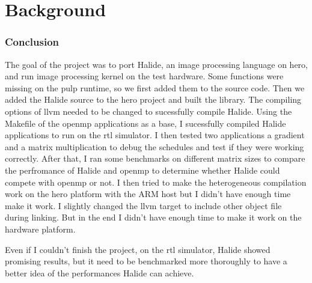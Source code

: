 
\chapter{Background}


\subsection{Conclusion}
The goal of the project was to port Halide, an image processing language on \gls{hero}, and run image processing kernel on the test hardware.
Some functions were missing on the \gls{pulp} runtime, so we first added them to the source code. 
Then we added the Halide source to the \gls{hero} project and built the library. The compiling options of \gls{llvm} needed to be changed to sucessfully compile Halide.
Using the Makefile of the \gls{openmp} applications as a base, I sucessfully compiled Halide applications to run on the \gls{rtl} simulator.
I then tested two applications a gradient and a matrix multiplication to debug the schedules and test if they were working correctly.
After that, I ran some benchmarks on different matrix sizes to compare the perfromance of Halide and \gls{openmp} to determine whether Halide could compete with \gls{openmp} or not.
I then tried to make the heterogeneous compilation work on the \gls{hero} platform with the ARM host but I didn't have enough time make it work. I slightly changed the \gls{llvm} target to include other object file during linking. But in the end I didn't have enough time to make it work on the hardware platform.

Even if I couldn't finish the project, on the \gls{rtl} simulator, Halide showed promising results, but it need to be benchmarked more thoroughly to have a better idea of the performances Halide can achieve.

